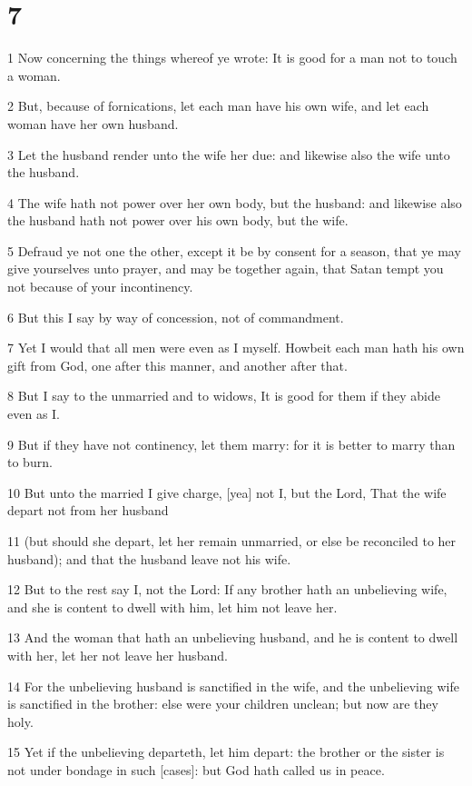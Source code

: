 \chapter{7}

\par 1 Now concerning the things whereof ye wrote: It is good for a man not to touch a woman.
\par 2 But, because of fornications, let each man have his own wife, and let each woman have her own husband.
\par 3 Let the husband render unto the wife her due: and likewise also the wife unto the husband.
\par 4 The wife hath not power over her own body, but the husband: and likewise also the husband hath not power over his own body, but the wife.
\par 5 Defraud ye not one the other, except it be by consent for a season, that ye may give yourselves unto prayer, and may be together again, that Satan tempt you not because of your incontinency.
\par 6 But this I say by way of concession, not of commandment.
\par 7 Yet I would that all men were even as I myself. Howbeit each man hath his own gift from God, one after this manner, and another after that.
\par 8 But I say to the unmarried and to widows, It is good for them if they abide even as I.
\par 9 But if they have not continency, let them marry: for it is better to marry than to burn.
\par 10 But unto the married I give charge, [yea] not I, but the Lord, That the wife depart not from her husband
\par 11 (but should she depart, let her remain unmarried, or else be reconciled to her husband); and that the husband leave not his wife.
\par 12 But to the rest say I, not the Lord: If any brother hath an unbelieving wife, and she is content to dwell with him, let him not leave her.
\par 13 And the woman that hath an unbelieving husband, and he is content to dwell with her, let her not leave her husband.
\par 14 For the unbelieving husband is sanctified in the wife, and the unbelieving wife is sanctified in the brother: else were your children unclean; but now are they holy.
\par 15 Yet if the unbelieving departeth, let him depart: the brother or the sister is not under bondage in such [cases]: but God hath called us in peace.
